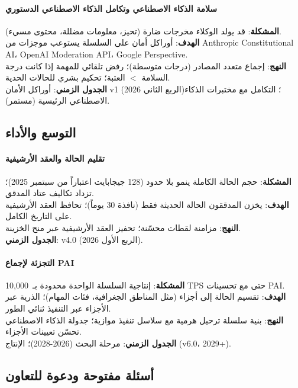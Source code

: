 \documentclass[11pt]{article}
\begin{document}
\paragraph{سلامة الذكاء الاصطناعي وتكامل الذكاء الاصطناعي الدستوري}
\textbf{المشكلة}: قد يولد الوكلاء مخرجات ضارة (تحيز، معلومات مضللة، محتوى مسيء).\\
\textbf{الهدف}: أوراكل أمان على السلسلة يستوعب موجزات من Anthropic Constitutional AI، OpenAI Moderation API، Google Perspective.\\
\textbf{النهج}: إجماع متعدد المصادر (درجات متوسطة)؛ رفض تلقائي للمهمة إذا كانت درجة السلامة $<$ العتبة؛ تحكيم بشري للحالات الحدية.\\
\textbf{الجدول الزمني}: أوراكل الأمان v1 (الربع الثاني 2026)؛ التكامل مع مختبرات الذكاء الاصطناعي الرئيسية (مستمر).

\subsection{التوسع والأداء}

\paragraph{تقليم الحالة والعقد الأرشيفية}
\textbf{المشكلة}: حجم الحالة الكاملة ينمو بلا حدود (128 جيجابايت اعتباراً من سبتمبر 2025)؛ تزداد تكاليف عتاد المدقق.\\
\textbf{الهدف}: يخزن المدققون الحالة الحديثة فقط (نافذة 30 يوماً)؛ تحافظ العقد الأرشيفية على التاريخ الكامل.\\
\textbf{النهج}: مزامنة لقطات محسّنة؛ تحفيز العقد الأرشيفية عبر منح الخزينة.\\
\textbf{الجدول الزمني}: v4.0 (الربع الأول 2026).

\paragraph{التجزئة لإجماع PAI}
\textbf{المشكلة}: إنتاجية السلسلة الواحدة محدودة بـ~10,000 TPS حتى مع تحسينات PAI.\\
\textbf{الهدف}: تقسيم الحالة إلى أجزاء (مثل المناطق الجغرافية، فئات المهام)؛ الذرية عبر الأجزاء عبر التنفيذ ثنائي الطور.\\
\textbf{النهج}: بنية سلسلة ترحيل هرمية مع سلاسل تنفيذ موازية؛ جدولة الذكاء الاصطناعي تحسّن تعيينات الأجزاء.\\
\textbf{الجدول الزمني}: مرحلة البحث (2026-2028)؛ الإنتاج (v6.0، 2029+).

\subsection{أسئلة مفتوحة ودعوة للتعاون}
\end{document}
